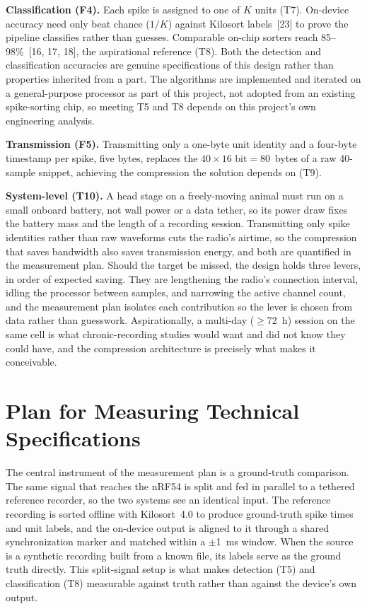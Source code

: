 \documentclass[11pt]{article}
\begin{document}
\textbf{Classification (F4).} Each spike is assigned to one of $K$ units (T7). On-device
accuracy need only beat chance ($1/K$) against Kilosort labels~[23] to prove the pipeline
classifies rather than guesses. Comparable on-chip sorters reach 85--98\%~[16, 17, 18], the
aspirational reference (T8). Both the detection and classification accuracies are genuine
specifications of this design rather than properties inherited from a part. The algorithms
are implemented and iterated on a general-purpose processor as part of this project, not
adopted from an existing spike-sorting chip, so meeting T5 and T8 depends on this
project's own engineering analysis.

\textbf{Transmission (F5).} Transmitting only a one-byte unit identity and a four-byte
timestamp per spike, five bytes, replaces the $40 \times 16\text{~bit} = 80$~bytes of a
raw 40-sample snippet, achieving the
compression the solution depends on (T9).

\textbf{System-level (T10).} A head stage on a freely-moving animal must run on a small
onboard battery, not wall power or a data tether, so its power draw fixes the battery mass
and the length of a recording session. Transmitting only spike identities rather than raw
waveforms cuts the radio's airtime, so the compression that saves bandwidth also saves
transmission energy, and both are quantified in the measurement plan. Should the target be
missed, the design holds three levers, in order of expected saving. They are lengthening the
radio's connection interval, idling the processor between samples, and narrowing the
active channel count, and the measurement plan isolates each contribution so the lever is
chosen from data rather than guesswork. Aspirationally, a multi-day ($\geq$72~h)
session on the same cell is what chronic-recording studies would want and did not know
they could have, and the compression architecture is precisely what makes it
conceivable.

\section{Plan for Measuring Technical Specifications}

The central instrument of the measurement plan is a ground-truth comparison. The same
signal that reaches the nRF54 is split and fed in parallel to a tethered
reference recorder, so the two systems see an identical input. The reference recording is
sorted offline with Kilosort~4.0 to produce ground-truth spike times and unit labels, and the
on-device output is aligned to it through a shared synchronization marker and matched within a
$\pm$1~ms window. When the source is a synthetic recording built from a known file, its labels
serve as the ground truth directly. This split-signal setup is what makes detection (T5) and
classification (T8) measurable against truth rather than against the device's own output.
\end{document}

